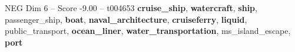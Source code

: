 \begin{textsample}{NEG Dim 6 – Score -9.00 – t004653}  \label{ex:f6_neg_020}
\textbf{cruise\_ship}, \textbf{watercraft}, \textbf{ship}, passenger\_ship, \textbf{boat}, \textbf{naval\_architecture}, \textbf{cruiseferry}, \textbf{liquid}, public\_transport, \textbf{ocean\_liner}, \textbf{water\_transportation}, ms\_island\_escape, \textbf{port}

\end{textsample}
